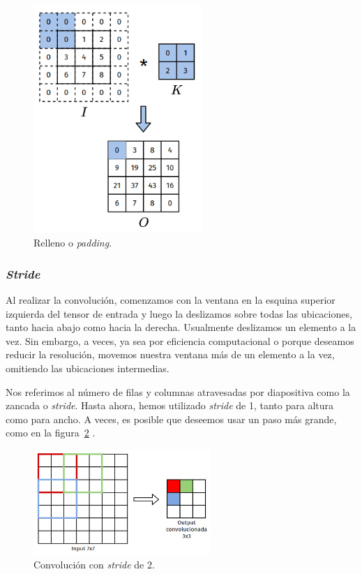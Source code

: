 \documentclass[a4paper,12pt]{article}
\begin{document}
\begin{figure}[H]
	\begin{center}				
		\includegraphics[width=0.57\textwidth]{conv-pad.png}
		\caption{Relleno o \textit{padding}.}
		\label{fig:padding}
	\end{center}
\end{figure}

\subsubsection{\textit{Stride}}

Al realizar la convolución, comenzamos con la ventana en la esquina superior izquierda del tensor de entrada y luego la deslizamos sobre todas las ubicaciones, tanto hacia abajo como hacia la derecha. Usualmente deslizamos un elemento a la vez. Sin embargo, a veces, ya sea por eficiencia computacional o porque deseamos reducir la resolución, movemos nuestra ventana más de un elemento a la vez, omitiendo las ubicaciones intermedias.

Nos referimos al número de filas y columnas atravesadas por diapositiva como la zancada o \textit{stride}. Hasta ahora, hemos utilizado \textit{stride} de 1, tanto para altura como para ancho. A veces, es posible que deseemos usar un paso más grande, como en la figura~\ref{fig:stride} \citep{Saha2020Oct}.

\begin{figure}[H]
	\begin{center}				
		\includegraphics[width=0.6\textwidth]{tesis_44.png}
		\caption{Convolución con \textit{stride} de 2.}
		\label{fig:stride}
	\end{center}
\end{figure}
\end{document}
